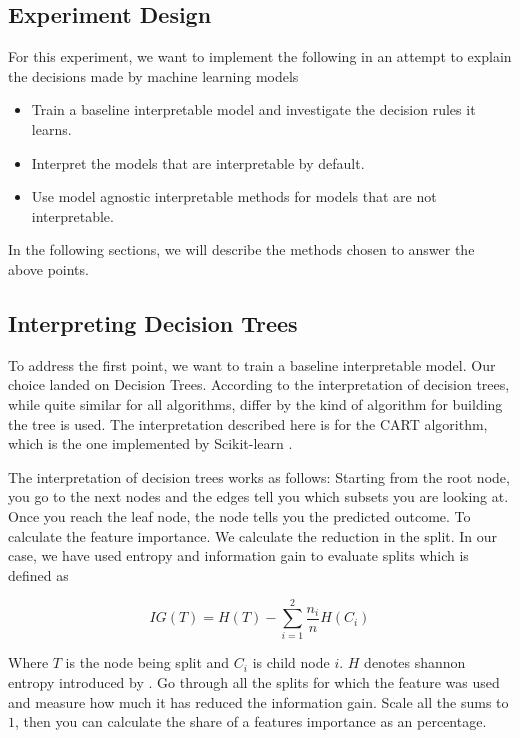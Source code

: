 \subsection{Experiment Design}

For this experiment, we want to implement the following in an attempt to explain the decisions made by machine learning models

\begin{itemize}
    \item Train a baseline interpretable model and investigate the decision rules it learns.
    \item Interpret the models that are interpretable by default.
    \item Use model agnostic interpretable methods for models that are not interpretable.
\end{itemize}

In the following sections, we will describe the methods chosen to answer the above points.

\subsection{Interpreting Decision Trees}

To address the first point, we want to train a baseline interpretable model. Our choice landed on Decision Trees. According to \citet{Molnar:2020:Book} the interpretation of decision trees, while quite similar for all algorithms, differ by the kind of algorithm for building the tree is used. The interpretation described here is for the CART algorithm, which is the one implemented by Scikit-learn \cite{Pedregosa:2011:JMLR}.

The interpretation of decision trees works as follows: Starting from the root node, you go to the next nodes and the edges tell you which subsets you are looking at. Once you reach the leaf node, the node tells you the predicted outcome. \cite{Molnar:2020:Book} To calculate the feature importance. We calculate the reduction in the split. In our case, we have used entropy and information gain to evaluate splits which is defined as 

\begin{equation*}
    IG(T) = H(T) - \sum_{i = 1}^{2} \frac{n_i}{n} H(C_i)
\end{equation*}

Where $T$ is the node being split and $C_i$ is child node $i$. $H$ denotes shannon entropy introduced by \citet{Shannon:1948:BellSystTechJ}. Go through all the splits for which the feature was used and measure how much it has reduced the information gain. Scale all the sums to $1$, then you can calculate the share of a features importance as an percentage.

